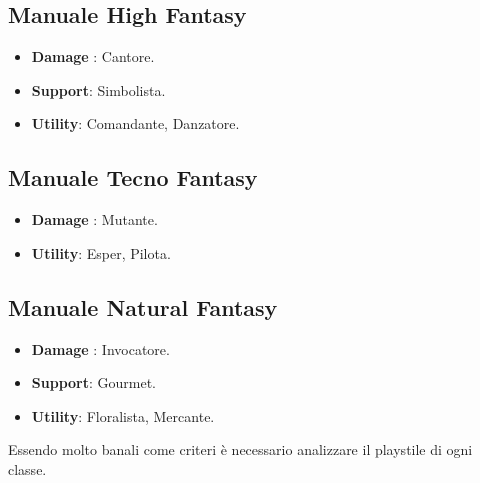 \documentclass{article}
\begin{document}
\subsection{Manuale High Fantasy}

\begin{itemize}
    \item \textbf{Damage} : Cantore.
    \item \textbf{Support}: Simbolista.
    \item \textbf{Utility}: Comandante, Danzatore.
\end{itemize}

\subsection{Manuale Tecno Fantasy}

\begin{itemize}
    \item \textbf{Damage} : Mutante.
    \item \textbf{Utility}: Esper, Pilota.
\end{itemize}

\subsection{Manuale Natural Fantasy}

\begin{itemize}
    \item \textbf{Damage} : Invocatore.
    \item \textbf{Support}: Gourmet.
    \item \textbf{Utility}: Floralista, Mercante.
\end{itemize}

Essendo molto banali come criteri è necessario analizzare il playstile di ogni classe.
\end{document}
